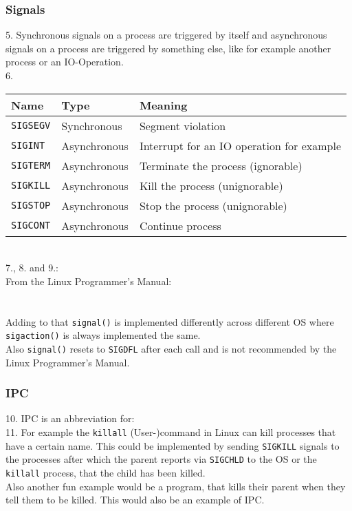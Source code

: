 \documentclass[12pt, a4paper]{article}
\begin{document}
\subsubsection*{Signals}
5. Synchronous signals on a process are triggered by itself and asynchronous signals on a process are triggered by something else, like for example another process or an IO-Operation. \\
6. \vspace*{0.2cm} \\
\begin{tabularx}{1\textwidth}{
    | >{\raggedright\arraybackslash}X
    | >{\raggedright\arraybackslash}X
    | >{\raggedright\arraybackslash}X |}
    \hline
    \hline
    Name    & Type & Meaning \\
    \hline
    \hline
    \verb|SIGSEGV| & Synchronous & Segment violation \\
    \hline
    \verb|SIGINT| 	& Asynchronous & Interrupt for an IO operation for example \\	
    \hline
    \verb|SIGTERM| & Asynchronous & Terminate the process (ignorable) \\		
    \hline
    \verb|SIGKILL| & Asynchronous & Kill the process (unignorable) \\		
    \hline
    \verb|SIGSTOP| & Asynchronous & Stop the process (unignorable) \\		
    \hline
    \verb|SIGCONT| & Asynchronous & Continue process \\
    \hline
    \hline
\end{tabularx} \vspace*{0.2cm} \\
7., 8. and 9.:\\
From the Linux Programmer's Manual: \\
 \\
 \\
Adding to that \verb|signal()| is implemented differently across different OS where \verb|sigaction()| is always implemented the same. \\
Also \verb|signal()| resets to \verb|SIGDFL| after each call and is not recommended by the Linux Programmer's Manual. \\
\subsubsection*{IPC}
10. IPC is an abbreviation for:  \\
11. For example the \verb|killall| (User-)command in Linux can kill processes that have a certain name. This could be implemented by sending \verb|SIGKILL| signals to the processes after which the parent reports via \verb|SIGCHLD| to the OS or the \verb|killall| process, that the child has been killed. \\
Also another fun example would be a program, that kills their parent when they tell them to be killed. This would also be an example of IPC. \\
\end{document}
